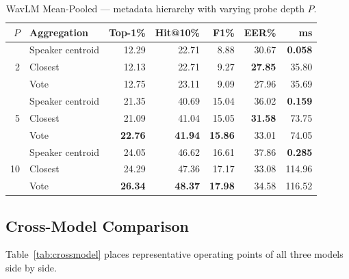\documentclass[12pt, a4paper]{article}
\begin{document}
\begin{table}[H]
\centering
\caption{WavLM Mean-Pooled --- metadata hierarchy with varying probe depth $P$.}
\label{tab:probes_wavlm}
\setlength{\tabcolsep}{4pt}
\begin{tabular}{rlrrrrr}
\toprule
$P$ & \textbf{Aggregation} &
\textbf{Top-1\%} & \textbf{Hit@10\%} &
\textbf{F1\%} & \textbf{EER\%} & \textbf{ms} \\
\midrule
\multirow{3}{*}{2}
  & Speaker centroid & 12.29 & 22.71 & 8.88  & 30.67 & \textbf{0.058} \\
  & Closest          & 12.13 & 22.71 & 9.27  & \textbf{27.85} & 35.80 \\
  & Vote             & 12.75 & 23.11 & 9.09  & 27.96 & 35.69 \\
\midrule
\multirow{3}{*}{5}
  & Speaker centroid & 21.35 & 40.69 & 15.04 & 36.02 & \textbf{0.159} \\
  & Closest          & 21.09 & 41.04 & 15.05 & \textbf{31.58} & 73.75 \\
  & Vote             & \textbf{22.76} & \textbf{41.94} & \textbf{15.86} & 33.01 & 74.05 \\
\midrule
\multirow{3}{*}{10}
  & Speaker centroid & 24.05 & 46.62 & 16.61 & 37.86 & \textbf{0.285} \\
  & Closest          & 24.29 & 47.36 & 17.17 & 33.08 & 114.96 \\
  & Vote             & \textbf{26.34} & \textbf{48.37} & \textbf{17.98} & 34.58 & 116.52 \\
\bottomrule
\end{tabular}
\end{table}

\subsection{Cross-Model Comparison}
\label{sec:results_crossmodel}

Table~\ref{tab:crossmodel} places representative operating points of
all three models side by side.
\end{document}
